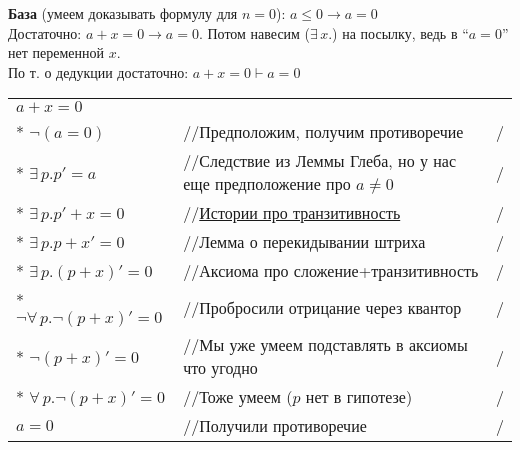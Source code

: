 \documentclass[12pt]{article}
\begin{document}
{\bf База} (умеем доказывать формулу для $n=0$): $a\leqslant 0\to a=0$\\
Достаточно: $a+x=0\to a=0$. Потом навесим ($\exists\,x.$) на посылку, ведь в ``$a=0$'' нет переменной $x$.\\
По т. о дедукции достаточно: $a+x=0\vdash a=0$\\
\begin{tabular*}{\textwidth}{l l l}
	$a+x=0$&&\\
	* $\neg (a=0)$ &//Предположим, получим противоречие&/\\
	* $\exists\,p.p'=a$&//Следствие из Леммы Глеба, но у нас еще предположение про $a\neq0$&/\\
	* $\exists\,p.p'+x=0$&//\hyperlink{tratsit_stories}{Истории про транзитивность}&/\\ %
	* $\exists\,p.p+x'=0$&//Лемма о перекидывании штриха&/\\ %
	* $\exists\,p.(p+x)'=0$&//Аксиома про сложение+транзитивность&/\\ %
	* $\neg\forall\,p.\neg(p+x)'=0$&//Пробросили отрицание через квантор&/\\
	* $\neg(p+x)'=0$&//Мы уже умеем подставлять в аксиомы что угодно&/\\ %
	* $\forall\,p.\neg(p+x)'=0$&//Тоже умеем ($p$ нет в гипотезе)&/\\
	$a=0$&//Получили противоречие&/
\end{tabular*}
\end{document}

